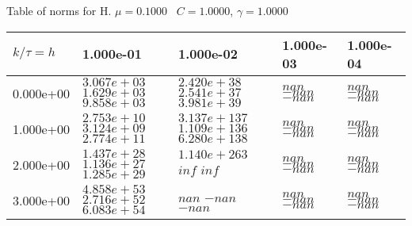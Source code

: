 \begin{center}
Table of norms for H. $\mu = 0.1000$ \, $C = 1.0000$, $\gamma = 1.0000$
  
\begin{tabular}{|p{1in}|p{1in}|p{1in}|p{1in}|p{1in}|} \hline
$k / \tau = h$ &1.000e-01 &1.000e-02 &1.000e-03 &1.000e-04 \\ \hline 
0.000e+00 & $3.067e+03$  $1.629e+03$  $9.858e+03$  & $2.420e+38$  $2.541e+37$  $3.981e+39$  & $nan$  $-nan$  $-nan$  & $nan$  $-nan$  $-nan$  \\ \hline 
1.000e+00 & $2.753e+10$  $3.124e+09$  $2.774e+11$  & $3.137e+137$  $1.109e+136$  $6.280e+138$  & $nan$  $-nan$  $-nan$  & $nan$  $-nan$  $-nan$  \\ \hline 
2.000e+00 & $1.437e+28$  $1.136e+27$  $1.285e+29$  & $1.140e+263$  $inf$  $inf$  & $nan$  $-nan$  $-nan$  & $nan$  $-nan$  $-nan$  \\ \hline 
3.000e+00 & $4.858e+53$  $2.716e+52$  $6.083e+54$  & $nan$  $-nan$  $-nan$  & $nan$  $-nan$  $-nan$  & $nan$  $-nan$  $-nan$  \\ \hline 

\end{tabular}\\[20pt]
\end{center}
